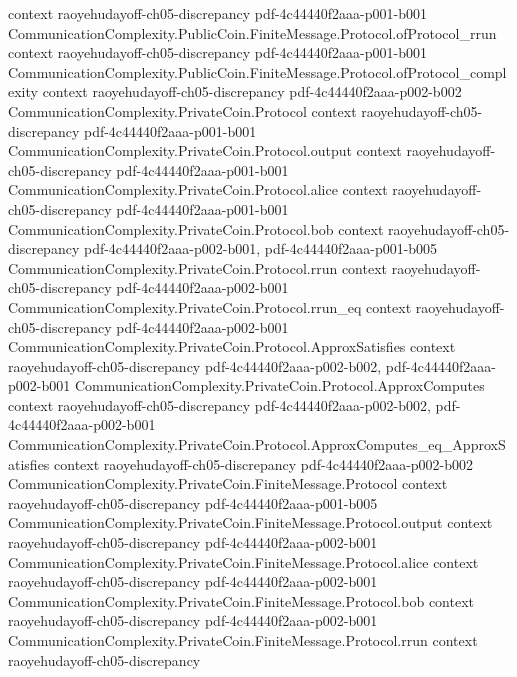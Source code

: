 \begin{theorem}
  {context}
  {raoyehudayoff-ch05-discrepancy}
  {pdf-4c44440f2aaa-p001-b001}
\proofstep
  {CommunicationComplexity.PublicCoin.FiniteMessage.Protocol.ofProtocol_rrun}
  {context}
  {raoyehudayoff-ch05-discrepancy}
  {pdf-4c44440f2aaa-p001-b001}
\proofstep
  {CommunicationComplexity.PublicCoin.FiniteMessage.Protocol.ofProtocol_complexity}
  {context}
  {raoyehudayoff-ch05-discrepancy}
  {pdf-4c44440f2aaa-p002-b002}
\proofstep
  {CommunicationComplexity.PrivateCoin.Protocol}
  {context}
  {raoyehudayoff-ch05-discrepancy}
  {pdf-4c44440f2aaa-p001-b001}
\proofstep
  {CommunicationComplexity.PrivateCoin.Protocol.output}
  {context}
  {raoyehudayoff-ch05-discrepancy}
  {pdf-4c44440f2aaa-p001-b001}
\proofstep
  {CommunicationComplexity.PrivateCoin.Protocol.alice}
  {context}
  {raoyehudayoff-ch05-discrepancy}
  {pdf-4c44440f2aaa-p001-b001}
\proofstep
  {CommunicationComplexity.PrivateCoin.Protocol.bob}
  {context}
  {raoyehudayoff-ch05-discrepancy}
  {pdf-4c44440f2aaa-p002-b001,
    pdf-4c44440f2aaa-p001-b005}
\proofstep
  {CommunicationComplexity.PrivateCoin.Protocol.rrun}
  {context}
  {raoyehudayoff-ch05-discrepancy}
  {pdf-4c44440f2aaa-p002-b001}
\proofstep
  {CommunicationComplexity.PrivateCoin.Protocol.rrun_eq}
  {context}
  {raoyehudayoff-ch05-discrepancy}
  {pdf-4c44440f2aaa-p002-b001}
\proofstep
  {CommunicationComplexity.PrivateCoin.Protocol.ApproxSatisfies}
  {context}
  {raoyehudayoff-ch05-discrepancy}
  {pdf-4c44440f2aaa-p002-b002,
    pdf-4c44440f2aaa-p002-b001}
\proofstep
  {CommunicationComplexity.PrivateCoin.Protocol.ApproxComputes}
  {context}
  {raoyehudayoff-ch05-discrepancy}
  {pdf-4c44440f2aaa-p002-b002,
    pdf-4c44440f2aaa-p002-b001}
\proofstep
  {CommunicationComplexity.PrivateCoin.Protocol.ApproxComputes_eq_ApproxSatisfies}
  {context}
  {raoyehudayoff-ch05-discrepancy}
  {pdf-4c44440f2aaa-p002-b002}
\proofstep
  {CommunicationComplexity.PrivateCoin.FiniteMessage.Protocol}
  {context}
  {raoyehudayoff-ch05-discrepancy}
  {pdf-4c44440f2aaa-p001-b005}
\proofstep
  {CommunicationComplexity.PrivateCoin.FiniteMessage.Protocol.output}
  {context}
  {raoyehudayoff-ch05-discrepancy}
  {pdf-4c44440f2aaa-p002-b001}
\proofstep
  {CommunicationComplexity.PrivateCoin.FiniteMessage.Protocol.alice}
  {context}
  {raoyehudayoff-ch05-discrepancy}
  {pdf-4c44440f2aaa-p002-b001}
\proofstep
  {CommunicationComplexity.PrivateCoin.FiniteMessage.Protocol.bob}
  {context}
  {raoyehudayoff-ch05-discrepancy}
  {pdf-4c44440f2aaa-p002-b001}
\proofstep
  {CommunicationComplexity.PrivateCoin.FiniteMessage.Protocol.rrun}
  {context}
  {raoyehudayoff-ch05-discrepancy}

\end{theorem}
